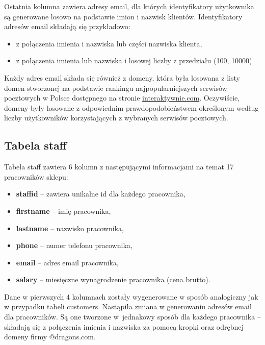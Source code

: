 \documentclass{article}
\begin{document}
		\noindent Ostatnia kolumna zawiera adresy email, dla których identyfikatory użytkownika są generowane losowo na podstawie imion i nazwisk klientów. Identyfikatory adresów email składają się przykładowo:
		\begin{itemize}
			\setlength{\itemsep}{-2pt}
			\item z połączenia imienia i nazwiska lub części nazwiska klienta,
			\item z połączenia imienia lub nazwiska i losowej liczby z przedziału (100, 10000).
		\end{itemize}
	
		\noindent Każdy adres email składa się również z domeny, która była losowana z listy domen stworzonej na podstawie rankingu najpopularniejszych serwisów pocztowych w Polsce dostępnego na stronie \href{https://interaktywnie.com/biznes/artykuly/biznes/przeglad-ktora-poczta-e-mail-jest-najlepsza-16950}{interaktywnie.com}. Oczywiście, domeny były losowane z odpowiednim prawdopodobieństwem określonym według  liczby użytkowników korzystających z wybranych serwisów pocztowych.
		
	\subsection{Tabela staff}
		Tabela staff zawiera 6 kolumn z następującymi informacjami na temat 17 pracowników sklepu:
		\begin{itemize}
			\setlength{\itemsep}{-2pt}
			\item \textbf{staff\textunderscore id} – zawiera unikalne id dla każdego pracownika,
			\item \textbf{first\textunderscore name} – imię pracownika,
			\item \textbf{last\textunderscore name} – nazwisko pracownika,
			\item \textbf{phone} – numer telefonu pracownika,
			\item \textbf{email} – adres email pracownika,
			\item \textbf{salary} – miesięczne wynagrodzenie pracownika (cena brutto).
		\end{itemize}
	
		\noindent Dane w pierwszych 4 kolumnach zostały wygenerowane w sposób analogiczny jak w przypadku tabeli customers. Nastąpiła zmiana w generowaniu adresów email dla pracowników. Są one tworzone w~jednakowy sposób dla każdego pracownika – składają się z połączenia imienia i nazwiska za pomocą kropki oraz odrębnej domeny firmy @dragons.com.\\
		
\end{document}
